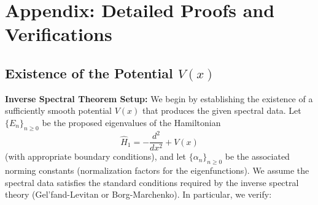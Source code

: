 \documentclass[12pt]{article}
\begin{document}
\section*{Appendix: Detailed Proofs and Verifications}

\subsection*{Existence of the Potential \(V(x)\)}

\textbf{Inverse Spectral Theorem Setup:} We begin by establishing the existence of a sufficiently smooth potential \(V(x)\) that produces the given spectral data. Let \(\{E_n\}_{n\ge0}\) be the proposed eigenvalues of the Hamiltonian 
\[
\hat{H}_1 = -\frac{d^2}{dx^2} + V(x)
\]
(with appropriate boundary conditions), and let \(\{\alpha_n\}_{n\ge0}\) be the associated norming constants (normalization factors for the eigenfunctions). We assume the spectral data satisfies the standard conditions required by the inverse spectral theory (Gel’fand-Levitan or Borg-Marchenko). In particular, we verify:
\end{document}

